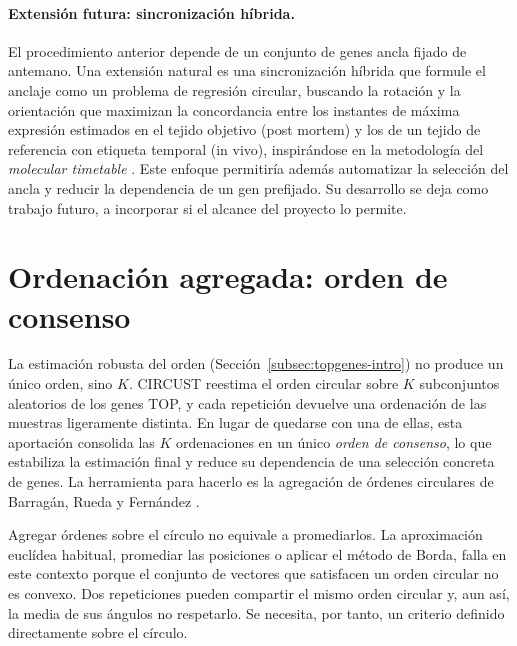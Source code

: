 \documentclass[12pt, a4paper]{report}
\begin{document}
\paragraph{Extensión futura: sincronización híbrida.} El procedimiento anterior depende de un conjunto de genes ancla fijado de antemano. Una extensión natural es una sincronización híbrida que formule el anclaje como un problema de regresión circular, buscando la rotación y la orientación que maximizan la concordancia entre los instantes de máxima expresión estimados en el tejido objetivo (post mortem) y los de un tejido de referencia con etiqueta temporal (in vivo), inspirándose en la metodología del \textit{molecular timetable} \cite{ueda2004}. Este enfoque permitiría además automatizar la selección del ancla y reducir la dependencia de un gen prefijado. Su desarrollo se deja como trabajo futuro, a incorporar si el alcance del proyecto lo permite.

\section{Ordenación agregada: orden de consenso}
\label{sec:agregacion}

La estimación robusta del orden (Sección~\ref{subsec:topgenes-intro}) no produce un único orden, sino $K$. CIRCUST reestima el orden circular sobre $K$ subconjuntos aleatorios de los genes TOP, y cada repetición devuelve una ordenación de las muestras ligeramente distinta. En lugar de quedarse con una de ellas, esta aportación consolida las $K$ ordenaciones en un único \emph{orden de consenso}, lo que estabiliza la estimación final y reduce su dependencia de una selección concreta de genes. La herramienta para hacerlo es la agregación de órdenes circulares de Barragán, Rueda y Fernández \cite{barragan2015}.

Agregar órdenes sobre el círculo no equivale a promediarlos. La aproximación euclídea habitual, promediar las posiciones o aplicar el método de Borda, falla en este contexto porque el conjunto de vectores que satisfacen un orden circular no es convexo. Dos repeticiones pueden compartir el mismo orden circular y, aun así, la media de sus ángulos no respetarlo. Se necesita, por tanto, un criterio definido directamente sobre el círculo.
\end{document}
